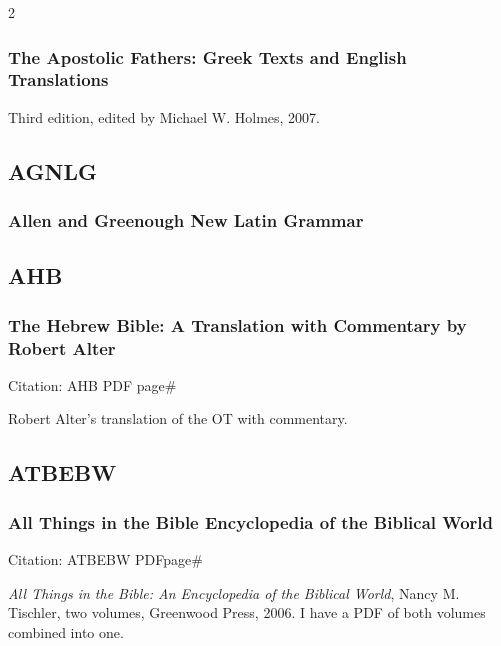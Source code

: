 \begin{multicols}{2}
		\subsubsection*{The Apostolic Fathers: Greek Texts and English Translations}
		
			Third edition, edited by Michael W. Holmes, 2007.
			
	\subsection*{AGNLG}
	
		\subsubsection*{Allen and Greenough New Latin Grammar}
		
			\phantom{.}
			
	\subsection*{AHB}
	
		\subsubsection*{The Hebrew Bible: A Translation with Commentary by Robert Alter}
		
			Citation:
				AHB PDF page\#
				
			Robert Alter's translation of the OT with commentary.
			
	\subsection*{ATBEBW}
	
		\subsubsection*{All Things in the Bible Encyclopedia of the Biblical World}
		
			Citation:
				ATBEBW PDFpage\#
		
			\textit{All Things in the Bible: An Encyclopedia of the Biblical World}, Nancy M. Tischler, two volumes, Greenwood Press, 2006. I have a PDF of both volumes combined into one.
			

\end{multicols}

